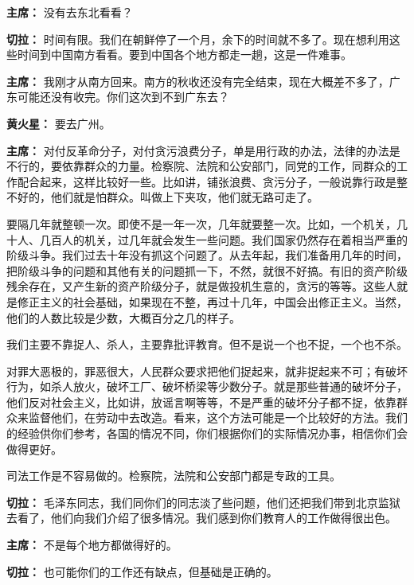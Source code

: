\begin{duihua}
\item[\textbf{主席：}] 没有去东北看看？

\item[\textbf{切拉：}] 时间有限。我们在朝鲜停了一个月，余下的时间就不多了。现在想利用这些时间到中国南方看看。要到中国各个地方都走一趟，这是一件难事。

\item[\textbf{主席：}] 我刚才从南方回来。南方的秋收还没有完全结束，现在大概差不多了，广东可能还没有收完。你们这次到不到广东去？

\item[\textbf{黄火星：}] 要去广州。

\item[\textbf{主席：}] 对付反革命分子，对付贪污浪费分子，单是用行政的办法，法律的办法是不行的，要依靠群众的力量。检察院、法院和公安部门，同党的工作，同群众的工作配合起来，这样比较好一些。比如讲，铺张浪费、贪污分子，一般说靠行政是整不好的，他们就是怕群众。叫做上下夹攻，他们就无路可走了。

要隔几年就整顿一次。即使不是一年一次，几年就要整一次。比如，一个机关，几十人、几百人的机关，过几年就会发生一些问题。我们国家仍然存在着相当严重的阶级斗争。我们过去十年没有抓这个问题了。从去年起，我们准备用几年的时间，把阶级斗争的问题和其他有关的问题抓一下，不然，就很不好搞。有旧的资产阶级残余存在，又产生新的资产阶级分子，就是做投机生意的，贪污的等等。这些人就是修正主义的社会基础，如果现在不整，再过十几年，中国会出修正主义。当然，他们的人数比较是少数，大概百分之几的样子。

我们主要不靠捉人、杀人，主要靠批评教育。但不是说一个也不捉，一个也不杀。

对罪大恶极的，罪恶很大，人民群众要求把他们捉起来，就非捉起来不可；有破坏行为，如杀人放火，破坏工厂、破坏桥梁等少数分子。就是那些普通的破坏分子，他们反对社会主义，比如讲，放谣言啊等等，不是严重的破坏分子都不捉，依靠群众来监督他们，在劳动中去改造。看来，这个方法可能是一个比较好的方法。我们的经验供你们参考，各国的情况不同，你们根据你们的实际情况办事，相信你们会做得更好。

司法工作是不容易做的。检察院，法院和公安部门都是专政的工具。

\item[\textbf{切拉：}] 毛泽东同志，我们同你们的同志淡了些问题，他们还把我们带到北京监狱去看了，他们向我们介绍了很多情况。我们感到你们教育人的工作做得很出色。

\item[\textbf{主席：}] 不是每个地方都做得好的。

\item[\textbf{切拉：}] 也可能你们的工作还有缺点，但基础是正确的。


\end{duihua}
